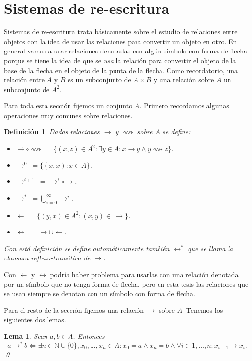 \documentclass[12pt]{report}
\theoremstyle{customstyle}
\newtheorem{definition}[theorem]{Definición}
\newtheorem{lemma}[theorem]{Lema}
\theoremstyle{factstyle}
\begin{document}
\section{Sistemas de re-escritura}

Sistemas de re-escritura trata básicamente sobre el estudio de relaciones entre objetos con la idea de usar las relaciones para convertir un objeto en otro. En general vamos a usar relaciones denotadas con algún símbolo con forma de flecha porque se tiene la idea de que se \textsl{usa} la relación para convertir el objeto de la base de la flecha en el objeto de la punta de la flecha. Como recordatorio, una relación entre $A$ y $B$ es un subconjunto de $A × B$ y una relación sobre $A$ un subconjunto de $A^2$.

Para toda esta sección fijemos un conjunto $A$. Primero recordamos algunas operaciones muy comunes sobre relaciones.

\begin{definition}\label{def:operaciones relaciones}
  Dadas relaciones $→$ y $⟿$ sobre $A$ se define:
  \begin{itemize}
    \item $→ ∘ ⟿\ = \{(x, z) ∈ A^2 : ∃y ∈ A : x → y ∧ y ⟿ z\}$.
    \item $→^0\ = \{(x, x) : x ∈ A\}$.
    \item $→^{i + 1}\ =\ →^i ∘ →$.
    \item $→^*\ = ⋃_{i = 0}^∞ →^i$.
    \item $←\ = \{(y, x) ∈ A^2 : (x, y) ∈\ →\}$.
    \item $↔\ =\ → ∪ ←$.
  \end{itemize}

  Con está definición se define automáticamente también $↔^*$ que se llama la clausura reflexo-transitiva de $→$.
\end{definition}

Con $←$ y $↔$ podría haber problema para usarlas con una relación denotada por un símbolo que no tenga forma de flecha, pero en esta tesis las relaciones que se usan siempre se denotan con un símbolo con forma de flecha.

Para el resto de la sección fijemos una relación $→$ sobre $A$. Tenemos los siguientes dos lemas.

\begin{lemma}\label{lemma:→* como ∃}
  Sean $a, b ∈ A$. Entonces
  \[ a →^* b ⇔ ∃n ∈ ℕ ∪ \{0\}, x_0, …, x_n ∈ A : x_0 = a ∧ x_n = b ∧ ∀i ∈ {1, …, n} : x_{i-1} → x_i \text{.}\]
  \qed
\end{lemma}
\end{document}
